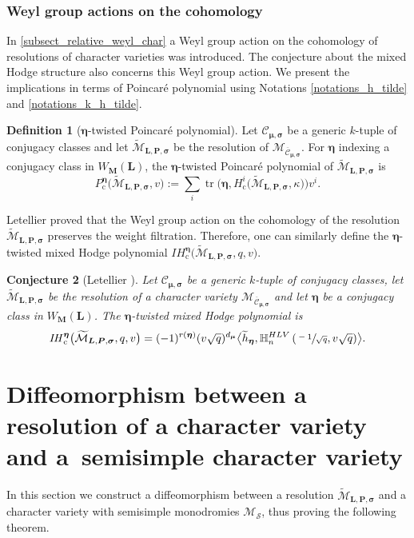 \documentclass[11pt]{article}
\newcommand{\rc}{\mathrm{c}}
\newcommand{\HLV}{\textup{HLV}}
\newcommand{\blangle}{\bigl\langle}
\newcommand{\brangle}{\bigr\rangle}
\theoremstyle{definition}
\newtheorem{definition}{Definition}[section]
\theoremstyle{plain}
\newtheorem{conjecture}[definition]{Conjecture}
\DeclareMathOperator{\tr}{tr}
\newcommand{\IH}{\mathit{IH}}
\newcommand{\mcmus}{\mathcal{M}_{\overline{\mathcal{C}}_{\boldsymbol{\mu},\boldsymbol{\sigma}}}}
\newcommand{\cmus}{\mathcal{C}_{\boldsymbol{\mu},\boldsymbol{\sigma}}}
\newcommand{\mlps}{\widetilde{\mathcal{M}}_{\boldsymbol{L},\boldsymbol{P},\boldsymbol{\sigma}}}
\begin{document}
\subsubsection{Weyl group actions on the cohomology}
In \ref{subsect_relative_weyl_char} a Weyl group action on the cohomology of resolutions of character varieties was introduced. The conjecture about the mixed Hodge structure also concerns this Weyl group action. We present the implications in terms of Poincaré polynomial using Notations \ref{notations_h_tilde} and \ref{notations_k_h_tilde}.
\begin{definition}[$\boldsymbol{\eta}$-twisted Poincaré polynomial]\label{def_twisted_Poincare}
Let $\mathcal{C}_{\boldsymbol{\mu},\boldsymbol{\sigma}}$ be a generic $k$-tuple of conjugacy classes and let $\mlps$ be the resolution of $\mcmus$. For $\boldsymbol{\eta}$ indexing a conjugacy class in $W_{\boldsymbol{M}}(\boldsymbol{L})$, the $\boldsymbol{\eta}$-twisted Poincaré polynomial of $\mlps$ is
\[
P_{\rc}^{\boldsymbol{\eta}}\bigl(\mlps,v\bigr) := \sum_{i} \tr\bigl(\boldsymbol{\eta}, H_\rc^i\bigl(\mlps, \kappa\bigr)\bigr)v^i.
\]
\end{definition}

Letellier proved that the Weyl group action on the cohomology of the resolution $\mlps$ preserves the weight filtration. Therefore, one can similarly define the $\boldsymbol{\eta}$\nobreakdash-twisted mixed Hodge polynomial $\IH_\rc^{\boldsymbol{\eta}}\bigl(\mlps,q,v\bigr)$.
\begin{conjecture}[Letellier {\cite[Conj.\,1.8]{Letellier13}}]\label{conj_twisted_mixed_resol}
Let $\cmus$ be a generic $k$-tuple of conjugacy classes, let $\mlps$ be the resolution of a character variety $\mcmus$ and let $\boldsymbol{\eta}$ be a conjugacy class in $W_{\boldsymbol{M}}(\boldsymbol{L})$. The $\boldsymbol{\eta}$-twisted mixed Hodge polynomial is
\[
\IH_\rc^{\boldsymbol{\eta}}\bigl(\mlps,q,v\bigr) = (-1)^{r(\boldsymbol{\eta})}(v\sqrt{q})^{d_{\boldsymbol{\mu}}} \blangle \widetilde{h}_{\boldsymbol{\eta}}, \mathbb{H}^{\HLV}_n \left(\sfrac{-1}{\sqrt{q}},v \sqrt{q}\right)\brangle.
\]

\end{conjecture}

\section{Diffeomorphism between a resolution of a character variety and a~semisimple character variety}\label{sect_diffeo_res}
In this section we construct a diffeomorphism between a resolution $\mlps$ and a character variety with semisimple monodromies $\mathcal{M}_{\boldsymbol{\mathcal{S}}}$, thus proving the following theorem.
\end{document}
